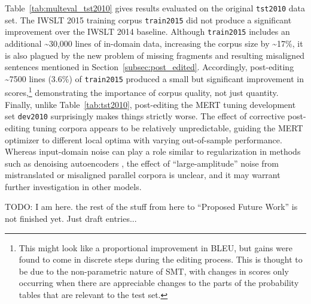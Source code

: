 {Table~\ref{tab:multeval_tst2010} gives results evaluated on the original {\small \tt tst2010} data set.
The IWSLT 2015 training corpus {\small \tt train2015} did not produce a significant improvement over the IWSLT 2014 baseline.
Although {\small \tt train2015} includes an additional \textasciitilde 30,000 lines of in-domain data, increasing the corpus size by \textasciitilde 17\%, it is also plagued by the new problem of missing fragments and resulting misaligned sentences mentioned in Section~\ref{subsec:post_edited}.
Accordingly, post-editing \textasciitilde 7500 lines (3.6\%) of {\small \tt train2015} produced a small but significant improvement in scores,\footnote{
This might look like a proportional improvement in BLEU, but gains were found to come in discrete steps during the editing process. This is thought to be due to the non-parametric nature of SMT, with changes in scores only occurring when there are appreciable changes to the parts of the probability tables that are relevant to the test set.
} demonstrating the importance of corpus quality, not just quantity.
Finally, unlike Table~\ref{tab:tst2010}, post-editing the MERT tuning development set {\small \tt dev2010} surprisingly makes things strictly worse.
The effect of corrective post-editing tuning corpora appears to be relatively unpredictable, guiding the MERT optimizer to different local optima with varying out-of-sample performance.
Whereas input-domain noise can play a role similar to regularization in methods such as denoising autoencoders , the effect of ``large-amplitude'' noise from mistranslated or misaligned parallel corpora is unclear, and it may warrant further investigation in other models.

\noindent\makebox[\linewidth]{\rule{\paperwidth}{0.4pt}}
TODO: I am here. the rest of the stuff from here to ``Proposed Future Work'' is not finished yet. Just draft entries...





}
